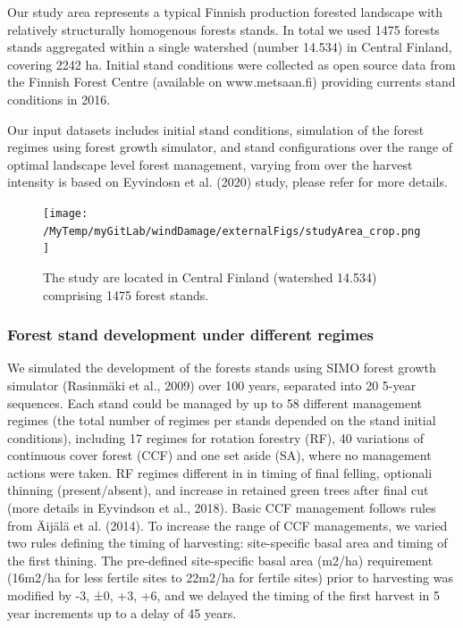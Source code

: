 \documentclass[]{elsarticle} %
\begin{document}
Our study area represents a typical Finnish production forested
landscape with relatively structurally homogenous forests stands. In
total we used 1475 forests stands aggregated within a single watershed
(number 14.534) in Central Finland, covering 2242 ha. Initial stand
conditions were collected as open source data from the Finnish Forest
Centre (available on www.metsaan.fi) providing currents stand conditions
in 2016.

Our input datasets includes initial stand conditions, simulation of the
forest regimes using forest growth simulator, and stand configurations
over the range of optimal landscape level forest management, varying
from over the harvest intensity is based on Eyvindosn et al. (2020)
study, please refer for more details.

\begin{figure}
\centering
\texttt{[image: /MyTemp/myGitLab/windDamage/externalFigs/studyArea\_crop.png]}
\caption{The study are located in Central Finland (watershed 14.534)
comprising 1475 forest stands.}
\end{figure}

\subsubsection{Forest stand development under different
regimes}\label{forest-stand-development-under-different-regimes}

We simulated the development of the forests stands using SIMO forest
growth simulator (Rasinmäki et al., 2009) over 100 years, separated into
20 5-year sequences. Each stand could be managed by up to 58 different
management regimes (the total number of regimes per stands depended on
the stand initial conditions), including 17 regimes for rotation
forestry (RF), 40 variations of continuous cover forest (CCF) and one
set aside (SA), where no management actions were taken. RF regimes
different in in timing of final felling, optionali thinning
(present/absent), and increase in retained green trees after final cut
(more details in Eyvindson et al., 2018). Basic CCF management follows
rules from Äijälä et al. (2014). To increase the range of CCF
managements, we varied two rules defining the timing of harvesting:
site-specific basal area and timing of the first thining. The
pre-defined site-specific basal area (m2/ha) requirement (16m2/ha for
less fertile sites to 22m2/ha for fertile sites) prior to harvesting was
modified by -3, ±0, +3, +6, and we delayed the timing of the first
harvest in 5 year increments up to a delay of 45 years.
\end{document}
